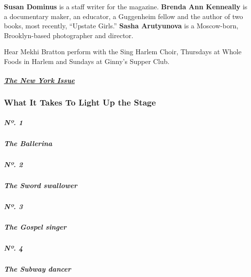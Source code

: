 \textbf{Susan Dominus} is a staff writer for the magazine.
\textbf{Brenda Ann Kenneally} is a documentary maker, an educator, a
Guggenheim fellow and the author of two books, most recently, ``Upstate
Girls.'' \textbf{Sasha Arutyunova} is a Moscow-born, Brooklyn-based
photographer and director.

Hear Mekhi Bratton perform with the Sing Harlem Choir, Thursdays at
Whole Foods in Harlem and Sundays at Ginny's Supper Club.

\hypertarget{the-new-york-issue-1}{%
\subparagraph{\texorpdfstring{\href{https://www.nytimes3xbfgragh.onion/interactive/2019/05/30/magazine/performers-new-york.html}{The
New York Issue}}{The New York Issue}}\label{the-new-york-issue-1}}

\hypertarget{what-it-takes-to-light-up-the-stage-1}{%
\subsubsection{What It Takes To Light Up the
Stage}\label{what-it-takes-to-light-up-the-stage-1}}

\href{https://www.nytimes3xbfgragh.onion/interactive/2019/05/30/magazine/dance-ballet-new-york.html}{}

\hypertarget{nuxba-1}{%
\subparagraph{Nº. 1}\label{nuxba-1}}

\hypertarget{the-ballerina}{%
\subparagraph{The Ballerina}\label{the-ballerina}}

\href{https://www.nytimes3xbfgragh.onion/interactive/2019/05/30/magazine/sword-swallowing-new-york.html}{}

\hypertarget{nuxba-2}{%
\subparagraph{Nº. 2}\label{nuxba-2}}

\hypertarget{the-sword-swallower}{%
\subparagraph{The Sword swallower}\label{the-sword-swallower}}

\href{https://www.nytimes3xbfgragh.onion/interactive/2019/05/30/magazine/gospel-singer-new-york.html}{}

\hypertarget{nuxba-3}{%
\subparagraph{Nº. 3}\label{nuxba-3}}

\hypertarget{the-gospel-singer}{%
\subparagraph{The Gospel singer}\label{the-gospel-singer}}

\href{https://www.nytimes3xbfgragh.onion/interactive/2019/05/30/magazine/subway-dance-new-york.html}{}

\hypertarget{nuxba-4}{%
\subparagraph{Nº. 4}\label{nuxba-4}}

\hypertarget{the-subway-dancer}{%
\subparagraph{The Subway dancer}\label{the-subway-dancer}}

